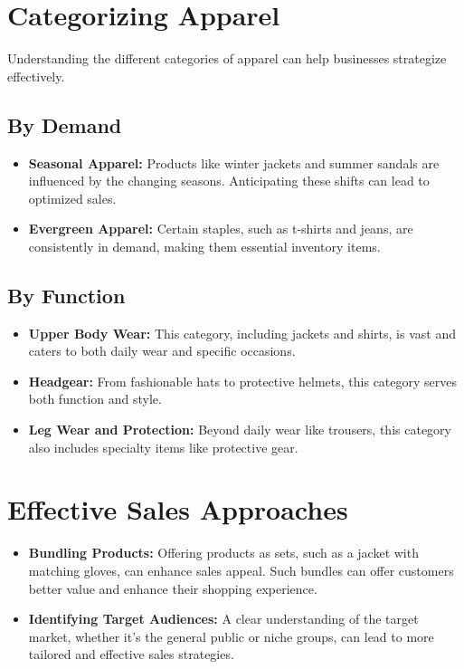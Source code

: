 \documentclass{article}
\begin{document}
    \section{Categorizing Apparel}
    Understanding the different categories of apparel can help businesses strategize effectively.
    \subsection{By Demand}
    \begin{itemize}
        \item \textbf{Seasonal Apparel:} Products like winter jackets and summer sandals are influenced by the changing seasons. Anticipating these shifts can lead to optimized sales.
        \item \textbf{Evergreen Apparel:} Certain staples, such as t-shirts and jeans, are consistently in demand, making them essential inventory items.
    \end{itemize}
    \subsection{By Function}
    \begin{itemize}
        \item \textbf{Upper Body Wear:} This category, including jackets and shirts, is vast and caters to both daily wear and specific occasions.
        \item \textbf{Headgear:} From fashionable hats to protective helmets, this category serves both function and style.
        \item \textbf{Leg Wear and Protection:} Beyond daily wear like trousers, this category also includes specialty items like protective gear.
    \end{itemize}

    \section{Effective Sales Approaches}
    \begin{itemize}
        \item \textbf{Bundling Products:} Offering products as sets, such as a jacket with matching gloves, can enhance sales appeal. Such bundles can offer customers better value and enhance their shopping experience.
        \item \textbf{Identifying Target Audiences:} A clear understanding of the target market, whether it's the general public or niche groups, can lead to more tailored and effective sales strategies.
    \end{itemize}
\end{document}
